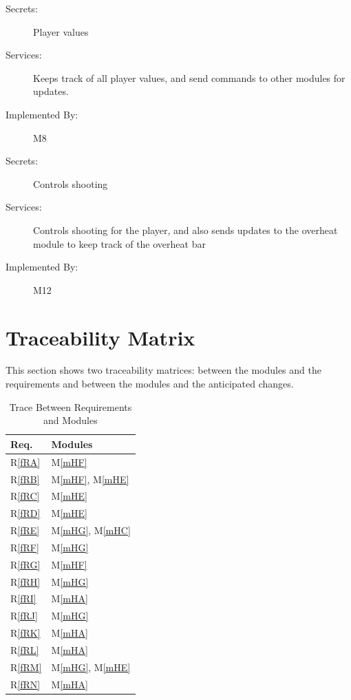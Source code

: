 \documentclass[12pt, titlepage]{article}
\newcommand{\mref}[1]{M\ref{#1}}
\newcommand{\fref}[1]{R\ref{#1}}
\begin{document}
\begin{description}
	\item[Secrets:] Player values
	\item[Services:] Keeps track of all player values, and send commands to other modules for updates.
	\item[Implemented By:] M8
\end{description}

\begin{description}
	\item[Secrets:] Controls shooting
	\item[Services:] Controls shooting for the player, and also sends updates to the overheat module to keep track of the overheat bar
	\item[Implemented By:] M12
\end{description}




\section{Traceability Matrix} \label{SecTM}

This section shows two traceability matrices: between the modules and the
requirements and between the modules and the anticipated changes.

\begin{table}[H]
\centering
\begin{tabular}{p{} p{}}
\toprule
\textbf{Req.} & \textbf{Modules}\\
\midrule
\fref{fRA} & \mref{mHF}\\
\fref{fRB} & \mref{mHF}, \mref{mHE}\\
\fref{fRC} & \mref{mHE}\\
\fref{fRD} & \mref{mHE}\\
\fref{fRE} & \mref{mHG}, \mref{mHC}\\
\fref{fRF} & \mref{mHG}\\
\fref{fRG} & \mref{mHF}\\
\fref{fRH} & \mref{mHG}\\
\fref{fRI} & \mref{mHA}\\
\fref{fRJ} & \mref{mHG}\\
\fref{fRK} & \mref{mHA}\\
\fref{fRL} & \mref{mHA}\\
\fref{fRM} & \mref{mHG}, \mref{mHE}\\
\fref{fRN} & \mref{mHA}\\
\bottomrule
\end{tabular}
\caption{Trace Between Requirements and Modules}
\label{TblRT}
\end{table}
\end{document}
